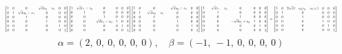 \documentclass[11pt]{article}
\theoremstyle{definition}
\begin{document}
\[
\scaletoalign{\textwidth}{{\left[\begin{matrix}1 & 0 & 0 & \sqrt{d} u_{0} - u_{1} & 0 & 0\\0 & 1 & \sqrt{d} u_{0} + u_{1} & 0 & 0 & 0\\0 & 0 & 1 & 0 & 0 & 0\\0 & 0 & 0 & 1 & 0 & 0\\0 & 0 & 0 & 0 & 1 & 0\\0 & 0 & 0 & 0 & 0 & 1\end{matrix}\right]} {\left[\begin{matrix}1 & \sqrt{d} v_{1} + v_{0} & 0 & 0 & 0 & 0\\0 & 1 & 0 & 0 & 0 & 0\\0 & 0 & 1 & 0 & 0 & 0\\0 & 0 & \sqrt{d} v_{1} - v_{0} & 1 & 0 & 0\\0 & 0 & 0 & 0 & 1 & 0\\0 & 0 & 0 & 0 & 0 & 1\end{matrix}\right]} {\left[\begin{matrix}1 & 0 & 0 & - \sqrt{d} u_{0} + u_{1} & 0 & 0\\0 & 1 & - \sqrt{d} u_{0} - u_{1} & 0 & 0 & 0\\0 & 0 & 1 & 0 & 0 & 0\\0 & 0 & 0 & 1 & 0 & 0\\0 & 0 & 0 & 0 & 1 & 0\\0 & 0 & 0 & 0 & 0 & 1\end{matrix}\right]} {\left[\begin{matrix}1 & - \sqrt{d} v_{1} - v_{0} & 0 & 0 & 0 & 0\\0 & 1 & 0 & 0 & 0 & 0\\0 & 0 & 1 & 0 & 0 & 0\\0 & 0 & - \sqrt{d} v_{1} + v_{0} & 1 & 0 & 0\\0 & 0 & 0 & 0 & 1 & 0\\0 & 0 & 0 & 0 & 0 & 1\end{matrix}\right]} = {\left[\begin{matrix}1 & 0 & 2 \sqrt{d} \left(- u_{0} v_{0} - u_{1} v_{1}\right) & 0 & 0 & 0\\0 & 1 & 0 & 0 & 0 & 0\\0 & 0 & 1 & 0 & 0 & 0\\0 & 0 & 0 & 1 & 0 & 0\\0 & 0 & 0 & 0 & 1 & 0\\0 & 0 & 0 & 0 & 0 & 1\end{matrix}\right]}}
\]
\[
\alpha = \left( 2, \  0, \  0, \  0, \  0, \  0\right), \quad \beta = \left( -1, \  -1, \  0, \  0, \  0, \  0\right)
\]
\end{document}
